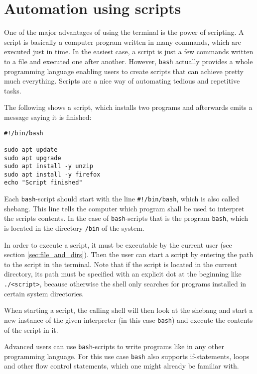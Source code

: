 \section{Automation using scripts}
\label{sec:scripting}

One of the major advantages of using the terminal is the power of scripting. A script is basically a computer program written in many commands, which are executed just in time. In the easiest case, a script is just a few commands written to a file and executed one after another. However, \lstinline{bash} actually provides a whole programming language enabling users to create scripts that can achieve pretty much everything. Scripts are a nice way of automating tedious and repetitive tasks.

The following shows a script, which installs two programs and afterwards emits a message saying it is finished:

\begin{lstlisting}
#!/bin/bash

sudo apt update
sudo apt upgrade
sudo apt install -y unzip
sudo apt install -y firefox
echo "Script finished"
\end{lstlisting}

Each \lstinline{bash}-script should start with the line \lstinline{#!/bin/bash}, which is also called shebang. This line tells the computer which program shall be used to interpret the scripts contents. In the case of \lstinline{bash}-scripts that is the program \lstinline{bash}, which is located in the directory \lstinline{/bin} of the system.

In order to execute a script, it must be executable by the current user (see section \ref{sec:file_and_dirs}). Then the user can start a script by entering the path to the script in the terminal. Note that if the script is located in the current directory, its path must be specified with an explicit dot at the beginning like \lstinline{./<script>}, because otherwise the shell only searches for programs installed in certain system directories.

When starting a script, the calling shell will then look at the shebang and start a new instance of the given interpreter (in this case \lstinline{bash}) and execute the contents of the script in it.

Advanced users can use \lstinline{bash}-scripts to write programs like in any other programming language. For this use case \lstinline{bash} also supports if-statements, loops and other flow control statements, which one might already be familiar with.